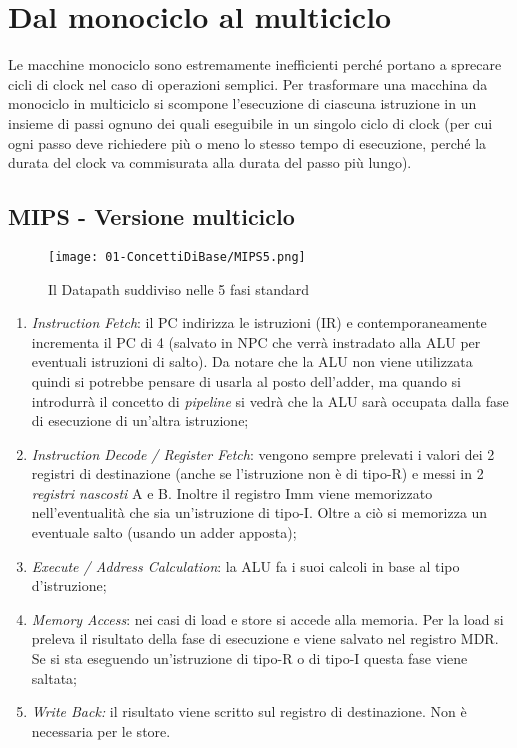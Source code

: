 
\section{Dal monociclo al multiciclo}

Le macchine monociclo sono estremamente inefficienti perché portano a sprecare cicli di clock nel caso di operazioni semplici. 
Per trasformare una macchina da monociclo in multiciclo si scompone l'esecuzione di ciascuna istruzione in un insieme di passi ognuno dei quali eseguibile in un singolo ciclo di clock (per cui ogni passo deve richiedere più o meno lo stesso tempo di esecuzione, perché la durata del clock va commisurata alla durata del passo più lungo). 


\subsection{MIPS - Versione multiciclo}

\begin{figure}[h]
    \centering
    \texttt{[image: 01-ConcettiDiBase/MIPS5.png]}
    \caption{Il Datapath suddiviso nelle 5 fasi standard}
\end{figure}


\begin{enumerate}
  \item \textit{Instruction Fetch}: il PC indirizza le istruzioni (IR) e contemporaneamente incrementa il PC di 4 (salvato in NPC che verrà instradato alla ALU per eventuali istruzioni di salto). Da notare che la ALU non viene utilizzata quindi si potrebbe pensare di usarla al posto dell'adder, ma quando si introdurrà il concetto di \textit{pipeline} si vedrà che la ALU sarà occupata dalla fase di esecuzione di un'altra istruzione;
  \item \textit{Instruction Decode / Register Fetch}: vengono sempre prelevati i valori dei 2 registri di destinazione (anche se l'istruzione non è di tipo-R) e messi in 2 \textit{registri nascosti} A e B. Inoltre il registro Imm viene memorizzato nell'eventualità che sia un'istruzione di tipo-I. Oltre a ciò si memorizza un eventuale salto (usando un adder apposta);
  \item \textit{Execute / Address Calculation}: la ALU fa i suoi calcoli in base al tipo d'istruzione;
  \item \textit{Memory Access}: nei casi di load e store si accede alla memoria. Per la load si preleva il risultato della fase di esecuzione e viene salvato nel registro MDR. Se si sta eseguendo un'istruzione di tipo-R o di tipo-I questa fase viene saltata;
  \item \textit{Write Back:} il risultato viene scritto sul registro di destinazione. Non è necessaria per le store.
\end{enumerate}

